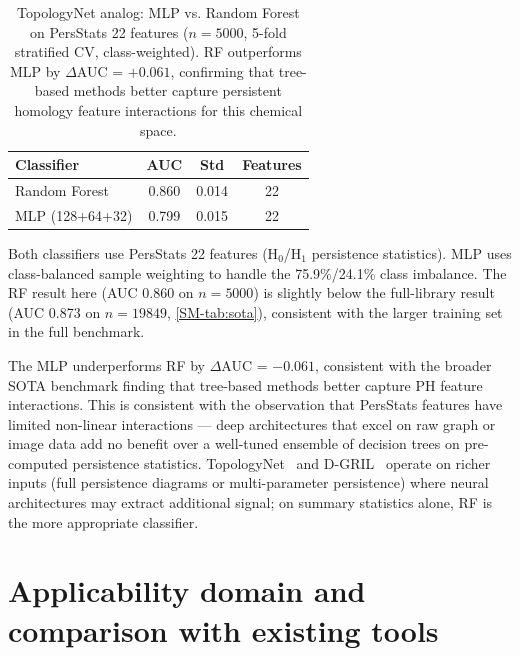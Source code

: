 \documentclass[11pt,a4paper]{article}
\begin{document}
\begin{table}[htbp]
\centering
\caption{TopologyNet analog: MLP vs. Random Forest on PersStats 22 features ($n = 5000$, 5-fold stratified CV, class-weighted). RF outperforms MLP by $\Delta$AUC = $+0.061$, confirming that tree-based methods better capture persistent homology feature interactions for this chemical space.}
\label{tab:topologynet_analog}
\begin{tabularx}{\textwidth}{l S[table-format=1.4] S[table-format=1.4] S[table-format=1.0]}
\toprule
{Classifier} & {AUC} & {Std} & {Features} \\
\midrule
Random Forest & 0.860 & 0.014 & 22 \\
MLP (128+64+32) & 0.799 & 0.015 & 22 \\
\bottomrule
\end{tabularx}
\vspace{1mm}
\footnotesize Both classifiers use PersStats 22 features (H$_0$/H$_1$ persistence statistics). MLP uses class-balanced sample weighting to handle the 75.9\%/24.1\% class imbalance. The RF result here (AUC 0.860 on $n = 5000$) is slightly below the full-library result (AUC 0.873 on $n = 19849$, \cref{SM-tab:sota}), consistent with the larger training set in the full benchmark.
\end{table}

The MLP underperforms RF by $\Delta$AUC = $-0.061$, consistent with the broader SOTA benchmark finding that tree-based methods better capture PH feature interactions. This is consistent with the observation that PersStats features have limited non-linear interactions --- deep architectures that excel on raw graph or image data add no benefit over a well-tuned ensemble of decision trees on pre-computed persistence statistics. TopologyNet~\citep{topologynet_2018} and D-GRIL~\citep{dgril_2026} operate on richer inputs (full persistence diagrams or multi-parameter persistence) where neural architectures may extract additional signal; on summary statistics alone, RF is the more appropriate classifier.

\vspace{4mm}


\section{Applicability domain and comparison with existing tools}
\label{sec:applicability_comparison}
\end{document}
